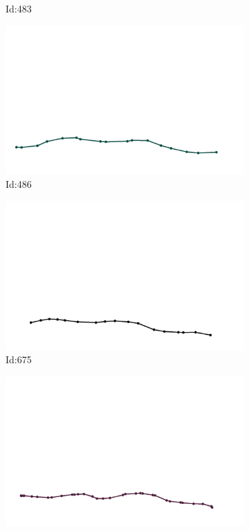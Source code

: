 \documentclass[12pt,twoside]{report}
\begin{document}
\begin{figure}
\begin{subfigure}[b]{0.20\textwidth}
\caption{Id:483}
\end{subfigure}
\begin{subfigure}[b]{0.20\textwidth}
\centering
\includegraphics[width=\textwidth]{../../trajectories/486.png}
\caption{Id:486}
\end{subfigure}
\begin{subfigure}[b]{0.20\textwidth}
\centering
\includegraphics[width=\textwidth]{../../trajectories/675.png}
\caption{Id:675}
\end{subfigure}
\begin{subfigure}[b]{0.20\textwidth}
\centering
\includegraphics[width=\textwidth]{../../trajectories/739.png}

\end{subfigure}
\end{figure}
\end{document}
